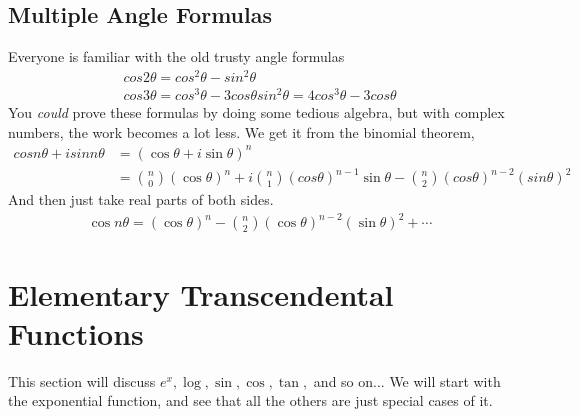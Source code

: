 \documentclass{article}
\begin{document}
\subsection{Multiple Angle Formulas}
Everyone is familiar with the old trusty angle formulas
\begin{gather*}
	cos2\theta = cos^2\theta - sin^2\theta \\
	cos3\theta = cos^3\theta - 3cos\theta sin^2\theta = 4cos^3\theta - 3cos\theta
\end{gather*}
You \textit{could} prove these formulas by doing some tedious algebra, but with complex numbers, the
work becomes a lot less. We get it from the binomial theorem,
\begin{align*}
	cosn\theta + isinn\theta & = (\cos\theta + i\sin\theta)^n                                                                                       \\
	                         & = \binom{n}{0}(\cos\theta)^n + i\binom{n}{1}(cos\theta)^{n-1}\sin\theta - \binom{n}{2}(cos\theta)^{n-2}(sin\theta)^2
\end{align*}
And then just take real parts of both sides.
\begin{gather*}
	\cos n\theta = (\cos\theta)^n - \binom{n}{2} (\cos\theta)^{n-2}(\sin\theta)^2 + \cdots
\end{gather*}
\section{Elementary Transcendental Functions}
This section will discuss $e^x, \log, \sin, \cos, \tan,$ and so on... We will start with the exponential
function, and see that all the others are just special cases of it.
\end{document}
